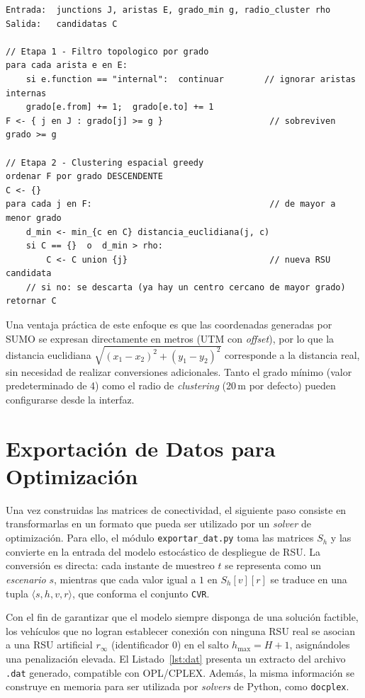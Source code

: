 \documentclass[smartcities,article,submit,oneauthor]{Definitions/mdpi}
\begin{document}
\begin{lstlisting}[caption={Pseudocódigo del algoritmo de selección de RSU
candidatas (filtro por grado + \emph{clustering} greedy).},label={lst:rsu}]
Entrada:  junctions J, aristas E, grado_min g, radio_cluster rho
Salida:   candidatas C

// Etapa 1 - Filtro topologico por grado
para cada arista e en E:
    si e.function == "internal":  continuar        // ignorar aristas internas
    grado[e.from] += 1;  grado[e.to] += 1
F <- { j en J : grado[j] >= g }                     // sobreviven grado >= g

// Etapa 2 - Clustering espacial greedy
ordenar F por grado DESCENDENTE
C <- {}
para cada j en F:                                   // de mayor a menor grado
    d_min <- min_{c en C} distancia_euclidiana(j, c)
    si C == {}  o  d_min > rho:
        C <- C union {j}                            // nueva RSU candidata
    // si no: se descarta (ya hay un centro cercano de mayor grado)
retornar C
\end{lstlisting}

Una ventaja práctica de este enfoque es que las coordenadas generadas por SUMO se
expresan directamente en metros (UTM con \emph{offset}), por lo que la distancia
euclidiana $\sqrt{(x_1-x_2)^2+(y_1-y_2)^2}$ corresponde a la distancia real, sin
necesidad de realizar conversiones adicionales. Tanto el grado mínimo (valor
predeterminado de 4) como el radio de \emph{clustering} (20\,m por defecto) pueden
configurarse desde la interfaz.

\section{Exportación de Datos para Optimización}\label{sec:export}

Una vez construidas las matrices de conectividad, el siguiente paso consiste en
transformarlas en un formato que pueda ser utilizado por un \emph{solver} de
optimización. Para ello, el módulo \texttt{exportar\_dat.py} toma las matrices $S_h$
y las convierte en la entrada del modelo estocástico de despliegue de RSU. La
conversión es directa: cada instante de muestreo $t$ se representa como un
\emph{escenario} $s$, mientras que cada valor igual a $1$ en $S_h[v][r]$ se traduce
en una tupla $\langle s,h,v,r\rangle$, que conforma el conjunto \texttt{CVR}.

Con el fin de garantizar que el modelo siempre disponga de una solución factible, los
vehículos que no logran establecer conexión con ninguna RSU real se asocian a una RSU
artificial $r_\infty$ (identificador $0$) en el salto
$h_{\max}=H+1$, asignándoles una penalización elevada. El
Listado~\ref{lst:dat} presenta un extracto del archivo \texttt{.dat} generado,
compatible con OPL/CPLEX. Además, la misma información se construye en memoria para
ser utilizada por \emph{solvers} de Python, como \texttt{docplex}.
\end{document}
